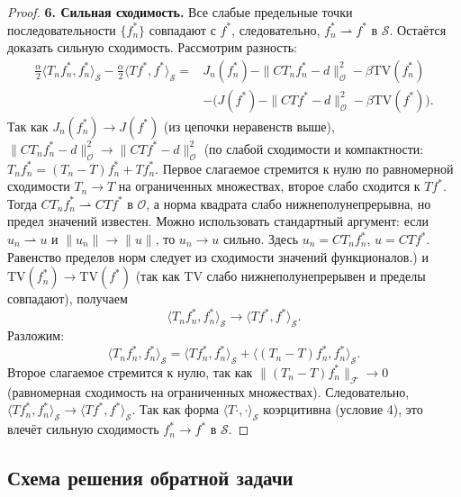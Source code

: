 \documentclass[a4paper,14pt,oneside,openany]{extarticle}
\begin{document}
\begin{proof}
\textbf{6. Сильная сходимость.}
Все слабые предельные точки последовательности $\{f_n^*\}$ совпадают с $f^*$, следовательно, $f_n^* \rightharpoonup f^*$ в $\mathcal{S}$.
Остаётся доказать сильную сходимость. Рассмотрим разность:
\begin{align*}
    \frac{\alpha}{2} \langle T_n f_n^*, f_n^*\rangle_{\mathcal{S}} - \frac{\alpha}{2} \langle T f^*, f^*\rangle_{\mathcal{S}}
    =& J_n(f_n^*) - \|C T_n f_n^* - d\|_{\mathcal{O}}^2 - \beta \mathrm{TV}(f_n^*) \\
    &- \bigl( J(f^*) - \|C T f^* - d\|_{\mathcal{O}}^2 - \beta \mathrm{TV}(f^*) \bigr).
\end{align*}
Так как $J_n(f_n^*) \to J(f^*)$ (из цепочки неравенств выше), $\|C T_n f_n^* - d\|_{\mathcal{O}}^2 \to \|C T f^* - d\|_{\mathcal{O}}^2$ (по слабой сходимости и компактности: $T_n f_n^* = (T_n - T) f_n^* + T f_n^*$. Первое слагаемое стремится к нулю по равномерной сходимости $T_n \to T$ на ограниченных множествах, второе слабо сходится к $T f^*$. Тогда $C T_n f_n^* \rightharpoonup C T f^*$ в $\mathcal{O}$, а норма квадрата слабо нижнеполунепрерывна, но предел значений известен. Можно использовать стандартный аргумент: если $u_n \rightharpoonup u$ и $\|u_n\| \to \|u\|$, то $u_n \to u$ сильно. Здесь $u_n = C T_n f_n^*$, $u = C T f^*$. Равенство пределов норм следует из сходимости значений функционалов.) и $\mathrm{TV}(f_n^*) \to \mathrm{TV}(f^*)$ (так как $\mathrm{TV}$ слабо нижнеполунепрерывен и пределы совпадают), получаем
\begin{equation}
    \langle T_n f_n^*, f_n^*\rangle_{\mathcal{S}} \to \langle T f^*, f^*\rangle_{\mathcal{S}}.
\end{equation}
Разложим:
\begin{equation}
    \langle T_n f_n^*, f_n^*\rangle_{\mathcal{S}} = \langle T f_n^*, f_n^*\rangle_{\mathcal{S}} + \langle (T_n - T) f_n^*, f_n^*\rangle_{\mathcal{S}}.
\end{equation}
Второе слагаемое стремится к нулю, так как $\| (T_n - T) f_n^*\|_{\mathcal{F}} \to 0$ (равномерная сходимость на ограниченных множествах).
Следовательно, $\langle T f_n^*, f_n^*\rangle_{\mathcal{S}} \to \langle T f^*, f^*\rangle_{\mathcal{S}}$.
Так как форма $\langle T \cdot, \cdot\rangle_{\mathcal{S}}$ коэрцитивна (условие 4), это влечёт сильную сходимость $f_n^* \to f^*$ в $\mathcal{S}$.
\end{proof}

\subsection{Схема решения обратной задачи}
\end{document}
